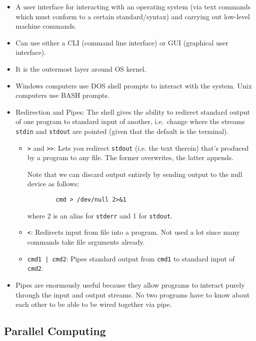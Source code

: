 \documentclass[12pt]{article}
\theoremstyle{plain}
\theoremstyle{definition}
\theoremstyle{remark}
\begin{document}
\begin{itemize}
  \item A user interface for interacting with an operating system (via
    text commands which must conform to a certain standard/syntax) and
    carrying out low-level machine commands.
  \item Can use either a CLI (command line interface) or GUI (graphical
    user interface).
  \item It is the outermost layer around OS kernel.
  \item Windows computers use DOS shell prompts to interact with the
    system. Unix computers use BASH prompts.
  \item
    Redirection and Pipes:
    The shell gives the ability to redirect standard output of one
    program to standard input of another, i.e.\ change where the streams
    \texttt{stdin} and \texttt{stdout} are pointed (given that the
    default is the terminal).
    \begin{itemize}
      \item \texttt{>} and \texttt{>>}: Lets you redirect \texttt{stdout}
        (i.e. the text therein) that's produced by a program to any file.
        The former overwrites, the latter appends.

        Note that we can discard output entirely by sending output to the
        null device as follows:
        \lstset{style=bash}
        \begin{lstlisting}
        cmd > /dev/null 2>&1
        \end{lstlisting}
        where 2 is an alias for \texttt{stderr} and 1 for \texttt{stdout}.

      \item \texttt{<}: Redirects input from file into a program.
        Not used a lot since many commands take file arguments already.

      \item
        \texttt{cmd1 | cmd2}:	Pipes standard output from \texttt{cmd1} to
        standard input of \texttt{cmd2}.
    \end{itemize}
  \item Pipes are enormously useful because they allow programs to
    interact purely through the input and output streams.
    No two programs have to know about each other to be able to be wired
    together via pipe.
\end{itemize}




\clearpage
\subsection{Parallel Computing}
\end{document}
